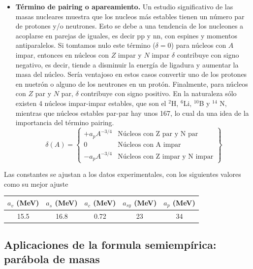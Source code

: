 \begin{itemize}
	\item \textbf{Término de pairing o apareamiento.} Un estudio significativo de las masas nucleares muestra que los nucleos más estables tienen un número par de protones y/o neutrones. Esto se debe a una tendencia de los nucleones a acoplarse en parejas de iguales, es decir pp y nn, con espines y momentos antiparalelos. Si tomtamos nulo este término ($\delta=0$) para núcleos con $A$ impar, entonces en núcleos con $Z$ impar y $N$ impar $\delta$ contribuye con signo negativo, es decir, tiende a disminuir la energía de ligadura y aumentar la masa del núcleo. Sería ventajoso en estos casos convertir uno de los protones en nuetrón o alguno de los neutrones en un protón. Finalmente, para núcleos con $Z$ par y $N$ par, $\delta$ contribuye con signo positivo. En la naturaleza sólo existen 4 núcleos impar-impar estables, que son el $^2$H, $^6$Li, $^{10}$B y $^{14}$ N, mientras que núcleos estables par-par hay unos 167, lo cual da una idea de la importancia del término pairing.
	      \begin{equation}
		      \delta (A) = \left\lbrace \begin{array}{rl}
			      +a_p A^{-3/4} & \text{Núcleos con Z par y N par}     \\
			      0             & \text{Núcleos con A impar}           \\
			      -a_p A^{-3/4} & \text{Núcleos con Z impar y N impar}
		      \end{array} \right \rbrace
	      \end{equation}
\end{itemize}
Las constantes se ajustan a los datos experimentales, con los siguientes valores como su mejor ajuste

\begin{table}[h!] \centering
	\begin{tabular}{ccccc}
		$a_v$ (MeV) & $a_s$ (MeV) & $a_c$ (MeV) & $a_{sy}$ (MeV) & $a_p$  (MeV) \\ \hline
		15.5        & 16.8        & 0.72        & 23             & 34
	\end{tabular}
\end{table}

\subsection{Aplicaciones de la formula semiempírica: parábola de masas}

